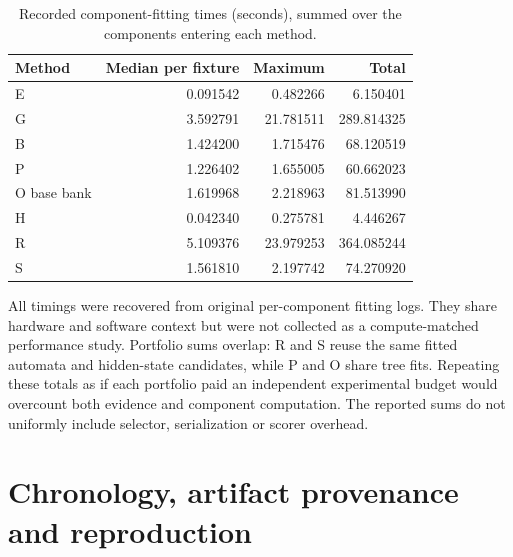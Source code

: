 \begin{table}[tbp]
\centering
\caption{Recorded component-fitting times (seconds), summed over the components entering each method.}\label{tab:times}
\small
\setlength{\tabcolsep}{5pt}
\begin{tabular}{lrrr}
\toprule
Method & Median per fixture & Maximum & Total \\
\midrule
E & 0.091542 & 0.482266 & 6.150401 \\
G & 3.592791 & 21.781511 & 289.814325 \\
B & 1.424200 & 1.715476 & 68.120519 \\
P & 1.226402 & 1.655005 & 60.662023 \\
O base bank & 1.619968 & 2.218963 & 81.513990 \\
H & 0.042340 & 0.275781 & 4.446267 \\
R & 5.109376 & 23.979253 & 364.085244 \\
S & 1.561810 & 2.197742 & 74.270920 \\
\bottomrule
\end{tabular}
\par{}
\end{table}


\FloatBarrier
All timings were recovered from original per-component fitting logs. They share hardware and software context but were not collected as a compute-matched performance study. Portfolio sums overlap: R and S reuse the same fitted automata and hidden-state candidates, while P and O share tree fits. Repeating these totals as if each portfolio paid an independent experimental budget would overcount both evidence and component computation. The reported sums do not uniformly include selector, serialization or scorer overhead.


\FloatBarrier

\section{Chronology, artifact provenance and reproduction}\label{app:chronology}\label{app:provenance}
